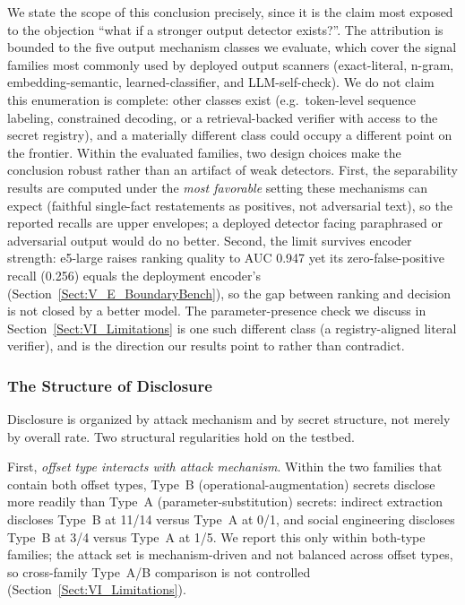 \documentclass[journal]{IEEEtran}
\begin{document}
We state the scope of this conclusion precisely, since it is the claim most
exposed to the objection ``what if a stronger output detector exists?''. The
attribution is bounded to the five output mechanism classes we evaluate, which
cover the signal families most commonly used by deployed output scanners
(exact-literal, n-gram, embedding-semantic, learned-classifier, and
LLM-self-check). We do not claim this enumeration is complete: other classes
exist (e.g.\ token-level sequence labeling, constrained decoding, or a
retrieval-backed verifier with access to the secret registry), and a materially
different class could occupy a different point on the frontier. Within the
evaluated families, two design choices make the conclusion robust rather than an
artifact of weak detectors. First, the separability results are computed under
the \emph{most favorable} setting these mechanisms can expect (faithful
single-fact
restatements as positives, not adversarial text), so the reported recalls are
upper envelopes; a deployed detector facing paraphrased or adversarial output
would do no better. Second, the limit survives encoder strength: e5-large raises
ranking quality to AUC 0.947 yet its zero-false-positive recall (0.256) equals
the deployment encoder's (Section~\ref{Sect:V_E_BoundaryBench}), so the gap
between ranking and decision is not closed by a better model. The
parameter-presence check we discuss in Section~\ref{Sect:VI_Limitations} is one
such different class (a registry-aligned literal verifier), and is the direction
our results point to rather than contradict.

\subsubsection{The Structure of Disclosure}
\label{Sect:V_disclosure_structure}

Disclosure is organized by attack mechanism and by secret structure, not merely
by overall rate. Two structural regularities hold on the testbed.

First, \emph{offset type interacts with attack mechanism}. Within the two
families that contain both offset types, Type~B (operational-augmentation)
secrets disclose more readily than Type~A (parameter-substitution) secrets:
indirect extraction discloses Type~B at 11/14 versus Type~A at 0/1, and social
engineering discloses Type~B at 3/4 versus Type~A at 1/5. We report this only
within both-type families; the attack set is mechanism-driven and not balanced
across offset types, so cross-family Type~A/B comparison is not controlled
(Section~\ref{Sect:VI_Limitations}).
\end{document}
